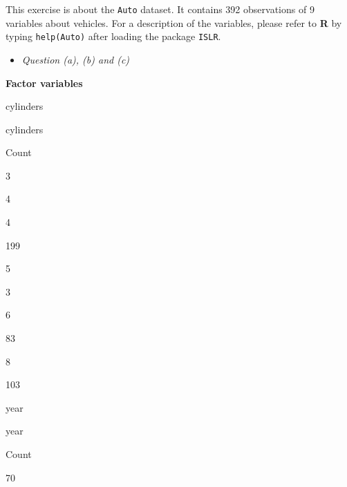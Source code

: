\documentclass[]{book}
\newenvironment{Shaded}{\begin{snugshade}}{\end{snugshade}}
\newcommand{\DataTypeTok}[1]{\textcolor[rgb]{0.13,0.29,0.53}{#1}}
\newcommand{\KeywordTok}[1]{\textcolor[rgb]{0.13,0.29,0.53}{\textbf{#1}}}
\newcommand{\NormalTok}[1]{#1}
\newcommand{\OperatorTok}[1]{\textcolor[rgb]{0.81,0.36,0.00}{\textbf{#1}}}
\newcommand{\OtherTok}[1]{\textcolor[rgb]{0.56,0.35,0.01}{#1}}
\newcommand{\StringTok}[1]{\textcolor[rgb]{0.31,0.60,0.02}{#1}}
\providecommand{\tightlist}{%
  \setlength{\itemsep}{0pt}\setlength{\parskip}{0pt}}
\begin{document}
This exercise is about the \texttt{Auto} dataset. It contains 392 observations of 9 variables about vehicles. For a description of the variables, please refer to \textbf{R} by typing \texttt{help(Auto)} after loading the package \texttt{ISLR}.

\begin{Shaded}
\end{Shaded}

\begin{itemize}
\tightlist
\item
  \emph{Question (a), (b) and (c)}
\end{itemize}

\begin{Shaded}
\end{Shaded}

\textbf{Factor variables}

cylinders

cylinders

Count

3

4

4

199

5

3

6

83

8

103

year

year

Count

70
\end{document}
